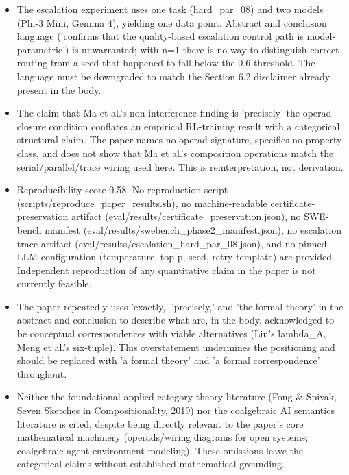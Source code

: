 \documentclass[11pt]{article}
\begin{document}
\begin{itemize}[leftmargin=*]
  \item [TECHNICAL CORRECTNESS — MAJOR, C5] The escalation experiment uses one task (hard\_par\_08) and two models (Phi-3 Mini, Gemma 4), yielding one data point. Abstract and conclusion language ('confirms that the quality-based escalation control path is model-parametric') is unwarranted; with n=1 there is no way to distinguish correct routing from a seed that happened to fall below the 0.6 threshold. The language must be downgraded to match the Section 6.2 disclaimer already present in the body.
  \item [TECHNICAL CORRECTNESS — MAJOR, C6] The claim that Ma et al.'s non-interference finding is 'precisely' the operad closure condition conflates an empirical RL-training result with a categorical structural claim. The paper names no operad signature, specifies no property class, and does not show that Ma et al.'s composition operations match the serial/parallel/trace wiring used here. This is reinterpretation, not derivation.
  \item [REPRODUCIBILITY — MAJOR] Reproducibility score 0.58. No reproduction script (scripts/reproduce\_paper\_results.sh), no machine-readable certificate-preservation artifact (eval/results/certificate\_preservation.json), no SWE-bench manifest (eval/results/swebench\_phase2\_manifest.json), no escalation trace artifact (eval/results/escalation\_hard\_par\_08.json), and no pinned LLM configuration (temperature, top-p, seed, retry template) are provided. Independent reproduction of any quantitative claim in the paper is not currently feasible.
  \item [TECHNICAL CORRECTNESS — MINOR, C1/C2/C17] The paper repeatedly uses 'exactly,' 'precisely,' and 'the formal theory' in the abstract and conclusion to describe what are, in the body, acknowledged to be conceptual correspondences with viable alternatives (Liu's lambda\_A, Meng et al.'s six-tuple). This overstatement undermines the positioning and should be replaced with 'a formal theory' and 'a formal correspondence' throughout.
  \item [MISSING PRIOR ART] Neither the foundational applied category theory literature (Fong \& Spivak, Seven Sketches in Compositionality, 2019) nor the coalgebraic AI semantics literature is cited, despite being directly relevant to the paper's core mathematical machinery (operads/wiring diagrams for open systems; coalgebraic agent-environment modeling). These omissions leave the categorical claims without established mathematical grounding.
\end{itemize}
\end{document}
